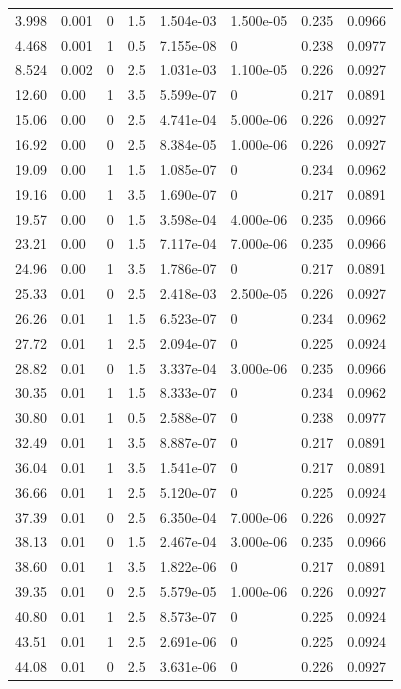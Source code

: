 \documentclass[preview]{standalone}
\begin{document}
{{\begin{tabular}{L{1.2cm}C{1.2cm} C{0.3cm}C{0.5cm} C{1.4cm}C{1.4cm} C{1.4cm}C{1.4cm}}
  3.998  &  0.001  & 0     & 1.5 &  1.504e-03  & 1.500e-05  & 0.235 &  0.0966   \\ 
  4.468  &  0.001  & 1     & 0.5 &  7.155e-08  & 0  & 0.238 &  0.0977   \\ 
  8.524  &  0.002  & 0     & 2.5 &  1.031e-03  & 1.100e-05  & 0.226 &  0.0927   \\ 
  12.60  &  0.00  & 1     & 3.5 &  5.599e-07  & 0  & 0.217 &  0.0891   \\ 
  15.06  &  0.00  & 0     & 2.5 &  4.741e-04  & 5.000e-06  & 0.226 &  0.0927   \\ 
  16.92  &  0.00  & 0     & 2.5 &  8.384e-05  & 1.000e-06  & 0.226 &  0.0927   \\ 
  19.09  &  0.00  & 1     & 1.5 &  1.085e-07  & 0  & 0.234 &  0.0962   \\ 
  19.16  &  0.00  & 1     & 3.5 &  1.690e-07  & 0  & 0.217 &  0.0891   \\ 
  19.57  &  0.00  & 0     & 1.5 &  3.598e-04  & 4.000e-06  & 0.235 &  0.0966   \\ 
  23.21  &  0.00  & 0     & 1.5 &  7.117e-04  & 7.000e-06  & 0.235 &  0.0966   \\ 
  24.96  &  0.00  & 1     & 3.5 &  1.786e-07  & 0  & 0.217 &  0.0891   \\ 
  25.33  &  0.01  & 0     & 2.5 &  2.418e-03  & 2.500e-05  & 0.226 &  0.0927   \\ 
  26.26  &  0.01  & 1     & 1.5 &  6.523e-07  & 0  & 0.234 &  0.0962   \\ 
  27.72  &  0.01  & 1     & 2.5 &  2.094e-07  & 0  & 0.225 &  0.0924   \\ 
  28.82  &  0.01  & 0     & 1.5 &  3.337e-04  & 3.000e-06  & 0.235 &  0.0966   \\ 
  30.35  &  0.01  & 1     & 1.5 &  8.333e-07  & 0  & 0.234 &  0.0962   \\ 
  30.80  &  0.01  & 1     & 0.5 &  2.588e-07  & 0  & 0.238 &  0.0977   \\ 
  32.49  &  0.01  & 1     & 3.5 &  8.887e-07  & 0  & 0.217 &  0.0891   \\ 
  36.04  &  0.01  & 1     & 3.5 &  1.541e-07  & 0  & 0.217 &  0.0891   \\ 
  36.66  &  0.01  & 1     & 2.5 &  5.120e-07  & 0  & 0.225 &  0.0924   \\ 
  37.39  &  0.01  & 0     & 2.5 &  6.350e-04  & 7.000e-06  & 0.226 &  0.0927   \\ 
  38.13  &  0.01  & 0     & 1.5 &  2.467e-04  & 3.000e-06  & 0.235 &  0.0966   \\ 
  38.60  &  0.01  & 1     & 3.5 &  1.822e-06  & 0  & 0.217 &  0.0891   \\ 
  39.35  &  0.01  & 0     & 2.5 &  5.579e-05  & 1.000e-06  & 0.226 &  0.0927   \\ 
  40.80  &  0.01  & 1     & 2.5 &  8.573e-07  & 0  & 0.225 &  0.0924   \\ 
  43.51  &  0.01  & 1     & 2.5 &  2.691e-06  & 0  & 0.225 &  0.0924   \\ 
  44.08  &  0.01  & 0     & 2.5 &  3.631e-06  & 0  & 0.226 &  0.0927   \\ 
\hline 
\end{tabular} 

}}
\end{document}
